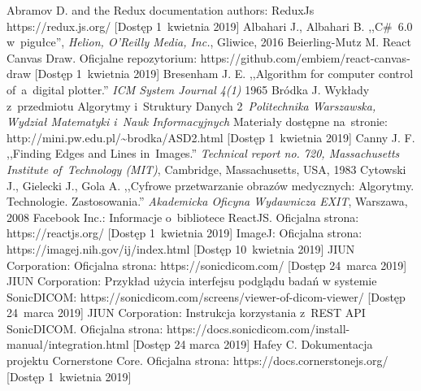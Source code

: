 \documentclass[a4paper,11pt,twoside,openright]{report}
\theoremstyle{definition}
\begin{document}
\begin{thebibliography}{24}%
{}


 Abramov D. and the Redux documentation authors: ReduxJs https://redux.js.org/ [Dostęp 1~kwietnia 2019]
 Albahari J., Albahari B. ,,C\#~6.0 w~pigułce'', \emph{Helion, O'Reilly Media, Inc.}, Gliwice,  2016
 Beierling-Mutz M. React Canvas Draw. Oficjalne repozytorium: https://github.com/embiem/react-canvas-draw [Dostęp 1~kwietnia 2019]
 Bresenham J. E. ,,Algorithm for computer control of~a~digital plotter.'' \emph{ICM System Journal 4(1)} 1965
 Bródka J. Wykłady z~przedmiotu Algorytmy i~Struktury Danych 2~\emph{Politechnika Warszawska, Wydział Matematyki i~Nauk Informacyjnych} Materiały dostępne na~stronie: http://mini.pw.edu.pl/\textasciitilde brodka/ASD2.html [Dostęp 1~kwietnia 2019]
 Canny J. F. ,,Finding Edges and Lines in~Images.'' \emph{Technical report no. 720, Massachusetts Institute of~Technology (MIT)}, Cambridge, Massachusetts, USA, 1983
 Cytowski J., Gielecki J., Gola A. ,,Cyfrowe przetwarzanie obrazów medycznych: Algorytmy. Technologie. Zastosowania.'' \emph{Akademicka Oficyna Wydawnicza EXIT}, Warszawa, 2008
 Facebook Inc.: Informacje o~bibliotece ReactJS. Oficjalna strona: https://reactjs.org/ [Dostęp 1~kwietnia 2019]
 ImageJ: Oficjalna strona: https://imagej.nih.gov/ij/index.html [Dostęp 10~kwietnia 2019]
 JIUN Corporation: Oficjalna strona: https://sonicdicom.com/ [Dostęp 24~marca 2019]
 JIUN Corporation: Przykład użycia interfejsu podglądu badań w systemie SonicDICOM: https://sonicdicom.com/screens/viewer-of-dicom-viewer/ [Dostęp 24~marca 2019]
 JIUN Corporation: Instrukcja korzystania z~REST API SonicDICOM. Oficjalna strona: https://docs.sonicdicom.com/install-manual/integration.html [Dostęp 24 marca 2019]
 Hafey C. Dokumentacja projektu Cornerstone Core. Oficjalna strona: https://docs.cornerstonejs.org/ [Dostęp 1~kwietnia 2019]

\end{thebibliography}
\end{document}
